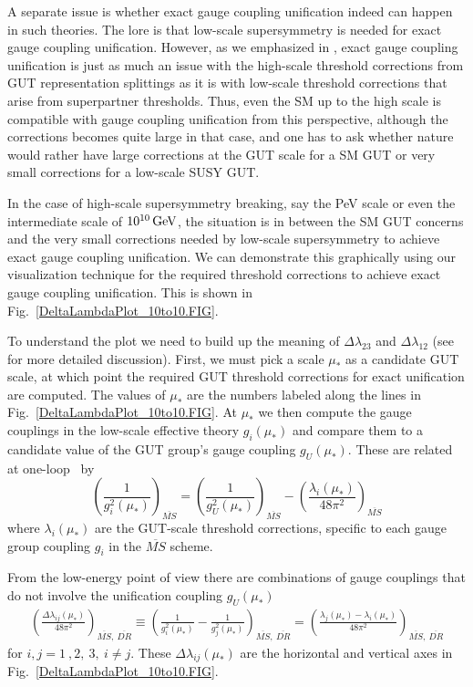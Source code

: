 \documentclass[12pt]{article}
\newcommand{\beq}{\begin{equation}}
\newcommand{\eeq}{\end{equation}}
\newcommand{\MS}{\overline{MS}}
\newcommand{\DR}{\overline{DR}}
\newcommand{\gev}{{\, {\rm GeV}}}
\begin{document}
A separate issue is whether exact gauge coupling unification indeed can happen in such theories. The lore is that low-scale supersymmetry is needed for exact gauge coupling unification. However, as we emphasized in \cite{Ellis:2015jwa}, exact gauge coupling unification is just as much an issue with the high-scale threshold corrections from GUT representation splittings as it is with low-scale threshold corrections that arise from superpartner thresholds. Thus, even the SM up to the high scale is compatible with gauge coupling unification from this perspective, although the corrections becomes quite large in that case, and one has to ask whether nature would rather have large corrections at the GUT scale for a SM GUT or very small corrections for a low-scale SUSY GUT. 

In the case of high-scale supersymmetry breaking, say the PeV scale or even the intermediate scale of $10^{10}\gev$, the situation is in between the SM GUT concerns and the very small corrections needed by low-scale supersymmetry to achieve exact gauge coupling unification. We can demonstrate this graphically using our visualization technique for the required threshold corrections to achieve exact gauge coupling unification. This is shown in Fig.~\ref{DeltaLambdaPlot_10to10.FIG}.

To understand the plot we need to build up the meaning of $\Delta\lambda_{23}$ and $\Delta\lambda_{12}$ (see \cite{Ellis:2015jwa} for more detailed discussion). First, we must pick a scale $\mu_*$ as a candidate GUT scale, at which point the required GUT threshold corrections for exact unification are computed. The values of $\mu_*$ are the numbers labeled along the lines in Fig.~\ref{DeltaLambdaPlot_10to10.FIG}. At $\mu_*$ we then compute the gauge couplings in the low-scale effective theory $g_i(\mu_*)$ and compare them to a candidate value of the GUT group's gauge coupling $g_U(\mu_*)$. These are related at one-loop~\cite{Weinberg:1980wa, Hall:1980kf} by
\beq
\label{BCunif.EQ}
\left(\frac{1}{g_i^2(\mu_*)}\right)_{\MS} = \left(\frac{1}{g_U^2(\mu_*)}\right)_{\MS} - \left(\frac{\lambda_i(\mu_*)}{48\pi^2}\right)_{\MS}
\eeq
where $\lambda_i(\mu_*)$ are the GUT-scale threshold corrections, specific to each gauge group coupling $g_i$ in the $\overline{MS}$ scheme.

From the low-energy point of view there are combinations of gauge couplings that do not involve the unification coupling $g_U(\mu_*)$
\begin{align}
\label{lij.EQ}
\left(\frac{\Delta\lambda_{ij}(\mu_*)}{48\pi^2}\right)_{\MS,~\DR} \equiv \left(\frac{1}{g_i^2(\mu_*)}-\frac{1}{g_j^2(\mu_*)}\right)_{\MS,~\DR} = \left(\frac{\lambda_j(\mu_*) - \lambda_i(\mu_*)}{48\pi^2}\right)_{\MS,~\DR}
\end{align}
for $i,j=1~,2,~3,~i\neq j$. These $\Delta\lambda_{ij}(\mu_*)$ are the horizontal and vertical axes in Fig.~\ref{DeltaLambdaPlot_10to10.FIG}.
\end{document}
